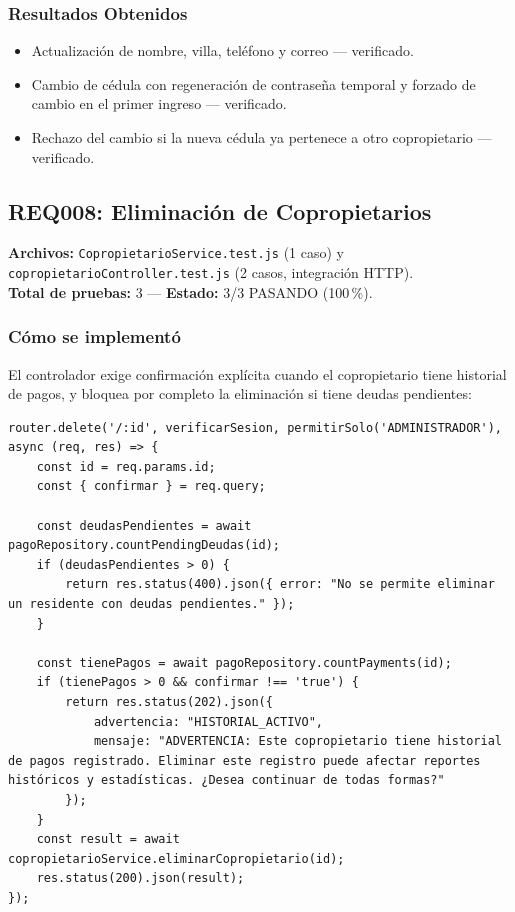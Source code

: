 \documentclass[12pt,a4paper]{article}
\begin{document}
\subsubsection*{Resultados Obtenidos}
\begin{itemize}[nosep]
    \item Actualización de nombre, villa, teléfono y correo — verificado.
    \item Cambio de cédula con regeneración de contraseña temporal y forzado de cambio en
    el primer ingreso — verificado.
    \item Rechazo del cambio si la nueva cédula ya pertenece a otro copropietario — verificado.
\end{itemize}

\subsection{REQ008: Eliminación de Copropietarios}
\textbf{Archivos:} \texttt{CopropietarioService.test.js} (1 caso) y
\texttt{copropietarioController.test.js} (2 casos, integración HTTP).\\
\textbf{Total de pruebas:} 3 — \textbf{Estado:} 3/3 PASANDO (100\,\%).

\subsubsection*{Cómo se implementó}

El controlador exige confirmación explícita cuando el copropietario tiene historial de
pagos, y bloquea por completo la eliminación si tiene deudas pendientes:

\begin{lstlisting}[caption={Confirmación por historial de pagos (\texttt{copropietarioController.js})}]
router.delete('/:id', verificarSesion, permitirSolo('ADMINISTRADOR'), async (req, res) => {
    const id = req.params.id;
    const { confirmar } = req.query;

    const deudasPendientes = await pagoRepository.countPendingDeudas(id);
    if (deudasPendientes > 0) {
        return res.status(400).json({ error: "No se permite eliminar un residente con deudas pendientes." });
    }

    const tienePagos = await pagoRepository.countPayments(id);
    if (tienePagos > 0 && confirmar !== 'true') {
        return res.status(202).json({
            advertencia: "HISTORIAL_ACTIVO",
            mensaje: "ADVERTENCIA: Este copropietario tiene historial de pagos registrado. Eliminar este registro puede afectar reportes históricos y estadísticas. ¿Desea continuar de todas formas?"
        });
    }
    const result = await copropietarioService.eliminarCopropietario(id);
    res.status(200).json(result);
});
\end{lstlisting}
\end{document}
